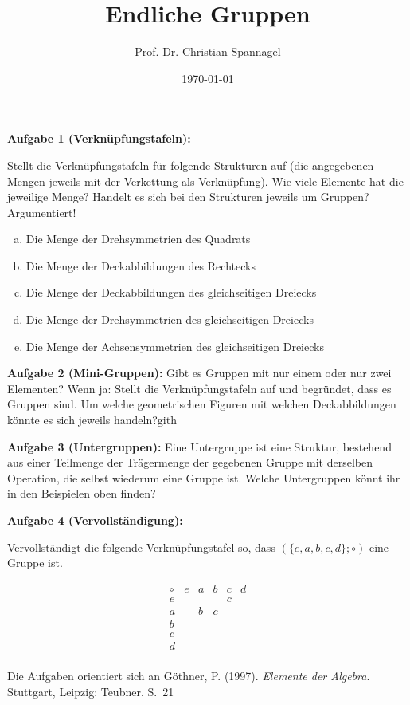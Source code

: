 \documentclass{cssheet}
\title{Endliche Gruppen}
\author{Prof. Dr. Christian Spannagel}
\date{\today}
\begin{document}
\printtitle


\textbf{Aufgabe 1 (Verknüpfungstafeln):} 

Stellt die Verknüpfungstafeln für folgende Strukturen auf (die angegebenen Mengen jeweils mit der Verkettung als Verknüpfung). Wie viele Elemente hat die jeweilige Menge? Handelt es sich bei den Strukturen jeweils um Gruppen? Argumentiert!
\begin{enumerate}[a)]
\item Die Menge der Drehsymmetrien des Quadrats
\item Die Menge der Deckabbildungen des Rechtecks
\item Die Menge der Deckabbildungen des gleichseitigen Dreiecks
\item Die Menge der Drehsymmetrien des  gleichseitigen Dreiecks
\item Die Menge der Achsensymmetrien des gleichseitigen Dreiecks
\end{enumerate}

\textbf{Aufgabe 2 (Mini-Gruppen):}  Gibt es Gruppen mit nur einem oder nur zwei Elementen? Wenn ja: Stellt die Verknüpfungstafeln auf und begründet, dass es Gruppen sind. Um welche geometrischen Figuren mit welchen Deckabbildungen könnte es sich jeweils handeln?gith

\textbf{Aufgabe 3 (Untergruppen):}  Eine Untergruppe ist eine Struktur, bestehend aus einer Teilmenge der Trägermenge der gegebenen Gruppe mit derselben Operation, die selbst wiederum eine Gruppe ist. Welche Untergruppen könnt ihr in den Beispielen oben finden?

\textbf{Aufgabe 4 (Vervollständigung):} 

Vervollständigt die folgende Verknüpfungstafel so, dass $(\{e,a,b,c,d\};\circ)$ eine Gruppe ist.

\[
\begin{array}{c|ccccc}
\circ & e & a & b & c & d \\
\hline
e &  &  &  & c &  \\
a &  & b & c &  &  \\
b &  &  &  &  &  \\
c &  &  &  &  &  \\
d &  &  &  &  &  \\
\end{array}
\]

{\tiny Die Aufgaben orientiert sich an Göthner, P. (1997). \emph{Elemente der Algebra}. Stuttgart, Leipzig: Teubner. S.~21}



\vspace*{2cm}
\printlicense

\printsocials
\end{document}
